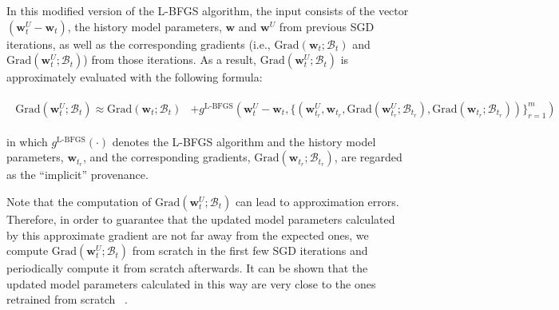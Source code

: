 \documentclass[11pt]{article}
\newcommand{\iw}{\textbf{w}^{I}}
\newcommand{\uw}{\textbf{w}^{U}}
\newcommand{\w}{\textbf{w}}
\newcommand{\miniB}{\mathscr{B}}
\begin{document}
In this modified version of the L-BFGS algorithm, the input consists of the vector $(\uw_{t} - \w_t)$, the history model parameters, $\w$ and $\uw$ from previous SGD iterations, as well as the corresponding gradients (i.e., $\text{Grad}(\w_t; \miniB_t)$ and $\text{Grad}(\uw_t; \miniB_t)$) from those iterations. As a result, $\text{Grad}(\uw_t; \miniB_t)$ is approximately evaluated with the following formula:
\begin{small}
\begin{align}\label{eq: l-bfgs algorithm}
\begin{split}
    \text{Grad}(\uw_t; \miniB_t) \approx \text{Grad}(\w_t; \miniB_t) & + g^{\text{L-BFGS}}(\uw_{t} - \w_t, \{(\uw_{t_r}, \w_{t_r}, \text{Grad}(\uw_{t_r}; \miniB_{t_r}), \text{Grad}(\w_{t_r}; \miniB_{t_r}))\}_{r=1}^m)
\end{split}
\end{align}
\end{small}
\noindent
in which $g^{\text{L-BFGS}}(\cdot)$ denotes the L-BFGS algorithm and the history model parameters, $\w_{t_r}$,
and the corresponding gradients, $\text{Grad}(\w_{t_r}; \miniB_{t_r})$, are regarded as the ``implicit'' provenance. 

Note that the computation of $\text{Grad}(\uw_t; \miniB_t)$ can lead to approximation errors. Therefore, in order to guarantee that the updated model parameters calculated by this approximate gradient are not far away from the expected ones, we compute $\text{Grad}(\uw_t; \miniB_t)$ from scratch in the first few SGD iterations 
and periodically compute it from scratch
afterwards. 
It can be shown that the updated model parameters calculated in this way are very close to the ones retrained from scratch~ \cite{wu2020deltagrad}.

\end{document}
